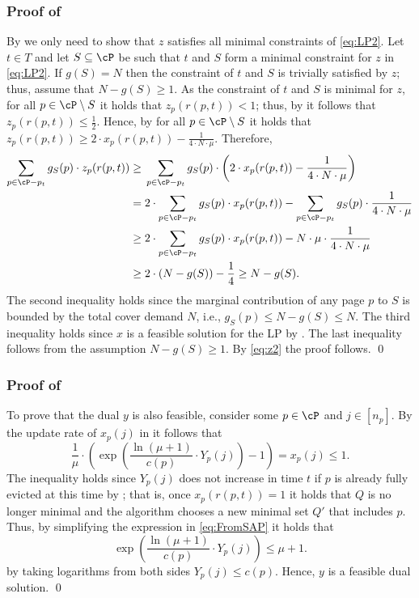 \subsubsection*{Proof of }
 	By  we only need to show that $z$ satisfies all minimal constraints of \eqref{eq:LP2}. Let $t \in T$ and let $S \subseteq \cP$ be such that $t$ and $S$ form a minimal constraint for $z$ in  \eqref{eq:LP2}. If $g(S) = N$ then the constraint of $t$ and $S$ is trivially satisfied by $z$; thus, assume that $N-g(S) \geq 1$. As the constraint of $t$ and $S$ is minimal for $z$, for all $p \in \cP\setminus S$ it holds that $z_p(r(p,t)) < 1$; thus, by  it follows that $z_p(r(p,t)) \leq \frac{1}{2}$. Hence,  by  for all $p \in \cP\setminus S$ it holds that 
 $z_p(r(p,t)) \geq 2 \cdot x_p(r(p,t))-\frac{1}{4 \cdot N \cdot \mu}$.
 Therefore,
\begin{equation}
	\label{eq:z2}
	\begin{aligned}
		 \sum_{p \in \cP-p_t} g_S(p) \cdot z_p(r(p,t))
		\geq{} &   \sum_{p \in \cP-p_t} g_S(p) \cdot \left( 2 \cdot x_p(r(p,t))-\frac{1}{4 \cdot N \cdot \mu} \right)\\
		={} & 2 \cdot \sum_{p \in \cP-p_t} g_S(p) \cdot x_p(r(p,t))-\sum_{p \in \cP-p_t} g_S(p) \cdot \frac{1}{4 \cdot N \cdot \mu} \\
		\geq{} & 2 \cdot \sum_{p \in \cP-p_t} g_S(p) \cdot x_p(r(p,t))-N \cdot \mu \cdot \frac{1}{4 \cdot N \cdot \mu} \\
			\geq{} & 2 \cdot \left(N-g(S)\right)-\frac{1}{4} 
				\geq N-g(S). 
	\end{aligned}
\end{equation}
The second inequality holds since the marginal contribution of any page $p$ to $S$ is bounded by the total cover demand $N$, i.e., $g_S(p) \leq N-g(S) \leq N$. The third inequality holds since $x$ is a feasible solution for the LP by .   The last inequality follows from the assumption $N-g(S) \geq 1$. By \eqref{eq:z2} the proof follows. \qed


\subsubsection*{Proof of }
To prove that the dual $y$ is also feasible, consider some $p \in \cP$ and $j \in [n_p]$. By the update rate of $x_p(j)$ in  it follows that 
		\begin{equation}
		\label{eq:FromSAP}
		\frac{1}{\mu} \cdot \left(     \exp \left(  \frac{\ln (\mu+1)}{c(p)} \cdot Y_p(j)\right)-1\right) = x_p(j) \leq 1.
	\end{equation} 
	The inequality holds since $Y_p(j)$ does not increase in time $t$ if $p$ is already fully evicted at this time by ; that is, once $x_p(r(p,t)) = 1$ it holds that $Q$ is no longer minimal and the algorithm chooses a new minimal set $Q'$ that includes $p$. Thus, by simplifying the expression in \eqref{eq:FromSAP} it holds that 
	$$\exp \left( \frac{\ln (\mu+1)}{c(p)} \cdot Y_p(j) \right) \leq \mu+1.$$
	by taking logarithms from both sides $Y_p(j) \leq c(p)$. Hence, $y$ is a feasible dual solution. \qed


